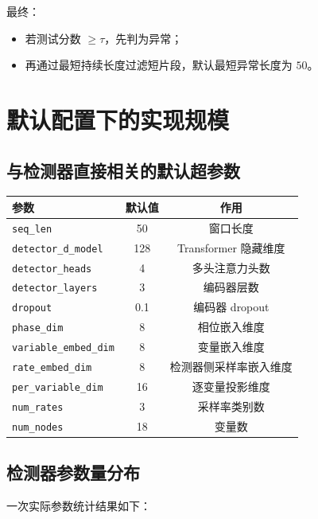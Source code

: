 \documentclass[UTF8]{ctexart}
\begin{document}
最终：
\begin{itemize}
    \item 若测试分数 \(\ge \tau\)，先判为异常；
    \item 再通过最短持续长度过滤短片段，默认最短异常长度为 \(50\)。
\end{itemize}

\section{默认配置下的实现规模}

\subsection{与检测器直接相关的默认超参数}

\begin{center}
\small
\begin{tabular}{lcc}
\toprule
参数 & 默认值 & 作用 \\
\midrule
\texttt{seq\_len} & 50 & 窗口长度 \\
\texttt{detector\_d\_model} & 128 & Transformer 隐藏维度 \\
\texttt{detector\_heads} & 4 & 多头注意力头数 \\
\texttt{detector\_layers} & 3 & 编码器层数 \\
\texttt{dropout} & 0.1 & 编码器 dropout \\
\texttt{phase\_dim} & 8 & 相位嵌入维度 \\
\texttt{variable\_embed\_dim} & 8 & 变量嵌入维度 \\
\texttt{rate\_embed\_dim} & 8 & 检测器侧采样率嵌入维度 \\
\texttt{per\_variable\_dim} & 16 & 逐变量投影维度 \\
\texttt{num\_rates} & 3 & 采样率类别数 \\
\texttt{num\_nodes} & 18 & 变量数 \\
\bottomrule
\end{tabular}
\end{center}

\subsection{检测器参数量分布}

一次实际参数统计结果如下：
\end{document}
